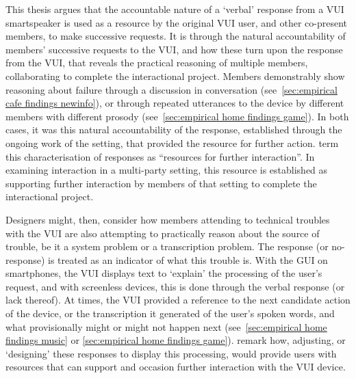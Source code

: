 {\begin{revisedsubmission}
This thesis argues that the accountable nature of a `verbal' response from a \ac{VUI} smartspeaker is used as a resource by the original \ac{VUI} user, and other co-present members, to make successive requests.
It is through the natural accountability of members' successive requests to the \ac{VUI}, and how these turn upon the response from the \ac{VUI}, that reveals the practical reasoning of multiple members, collaborating to complete the interactional project.
Members demonstrably show reasoning about failure through a discussion in conversation (see~\ref{sec:empirical cafe findings newinfo}), or through repeated utterances to the device by different members with different prosody (see~\ref{sec:empirical home findings game}).
In both cases, it was this natural accountability of the response, established through the ongoing work of the setting, that provided the resource for further action.
\citet[p. 10]{Porcheron2018} term this characterisation of responses as ``resources for further interaction''.
In examining interaction in a multi-party setting, this resource is established as supporting further interaction by  members of that setting to complete the interactional project.

Designers might, then, consider how members attending to technical troubles with the \ac{VUI} are also attempting to practically reason about the source of trouble, be it a system problem or a transcription problem.
The response (or no-response) is treated as an indicator of what this trouble is.
With the \ac{GUI} on smartphones, the \ac{VUI} displays text to `explain' the processing of the user's request, and with screenless devices, this is done through the verbal response (or lack thereof).
At times, the \ac{VUI} provided a reference to the next candidate action of the device, or the transcription it generated of the user's spoken words, and what provisionally might or might not happen next (see~\ref{sec:empirical home findings music} or \ref{sec:empirical home findings game}).
\citet{Porcheron2018} remark how, adjusting, or `designing' these responses to display this processing, would provide users with resources that can support and occasion further interaction with the \ac{VUI} device.


\end{revisedsubmission}}
